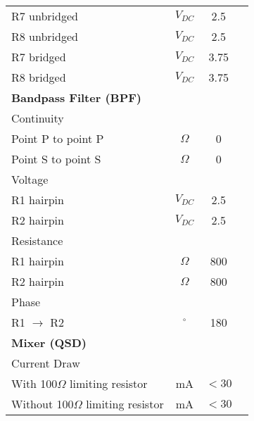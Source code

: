 \documentclass{article}[12pt]
\newcommand{\measline}{\underline{\hspace{0.75in}}}
\begin{document}
\begin{longtable}{lccc}
\hspace{0.5in}R7 unbridged & $V_{DC}$ & 2.5 & \measline \\
\hspace{0.5in}R8 unbridged & $V_{DC}$ & 2.5 & \measline \\
\hspace{0.5in}R7 bridged & $V_{DC}$ & 3.75 & \measline \\
\hspace{0.5in}R8 bridged & $V_{DC}$ & 3.75 & \measline \\
\hline
\multicolumn{4}{l}{\bf Bandpass Filter (BPF)} \\
\multicolumn{4}{l}{\hspace{0.25in}Continuity} \\
\hspace{0.5in}Point P to point P & $\Omega$ & 0 & \measline \\
\hspace{0.5in}Point S to point S & $\Omega$ & 0 & \measline \\
\multicolumn{4}{l}{\hspace{0.25in}Voltage} \\
\hspace{0.5in}R1 hairpin & $V_{DC}$ & 2.5 & \measline \\
\hspace{0.5in}R2 hairpin & $V_{DC}$ & 2.5 & \measline \\
\multicolumn{4}{l}{\hspace{0.25in}Resistance} \\
\hspace{0.5in}R1 hairpin & $\Omega$ & 800 & \measline \\
\hspace{0.5in}R2 hairpin & $\Omega$ & 800 & \measline \\
\multicolumn{4}{l}{\hspace{0.25in}Phase} \\
\hspace{0.5in}R1 $\rightarrow$ R2 & $^\circ$ & 180 & \measline \\
\hline
\multicolumn{4}{l}{\bf Mixer (QSD)} \\
\multicolumn{4}{l}{\hspace{0.25in}Current Draw} \\
\hspace{0.5in}With 100$\Omega$ limiting resistor & mA & $< 30$ & \measline \\
\hspace{0.5in}Without 100$\Omega$ limiting resistor & mA & $< 30$ & \measline \\

\end{longtable}
\end{document}
